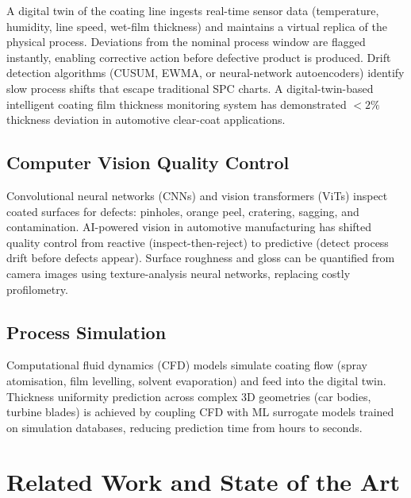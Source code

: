 \documentclass[11pt,a4paper]{article}
\begin{document}
A digital twin of the coating line ingests real-time sensor data (temperature, humidity, line speed, wet-film thickness) and maintains a virtual replica of the physical process.
Deviations from the nominal process window are flagged instantly, enabling corrective action before defective product is produced.
Drift detection algorithms (CUSUM, EWMA, or neural-network autoencoders) identify slow process shifts that escape traditional SPC charts.
A digital-twin-based intelligent coating film thickness monitoring system has demonstrated $< 2\%$ thickness deviation in automotive clear-coat applications.

\subsection{Computer Vision Quality Control}

Convolutional neural networks (CNNs) and vision transformers (ViTs) inspect coated surfaces for defects: pinholes, orange peel, cratering, sagging, and contamination.
AI-powered vision in automotive manufacturing has shifted quality control from reactive (inspect-then-reject) to predictive (detect process drift before defects appear).
Surface roughness and gloss can be quantified from camera images using texture-analysis neural networks, replacing costly profilometry.

\subsection{Process Simulation}

Computational fluid dynamics (CFD) models simulate coating flow (spray atomisation, film levelling, solvent evaporation) and feed into the digital twin.
Thickness uniformity prediction across complex 3D geometries (car bodies, turbine blades) is achieved by coupling CFD with ML surrogate models trained on simulation databases, reducing prediction time from hours to seconds.

\section{Related Work and State of the Art}
\label{sec:related}
\end{document}
